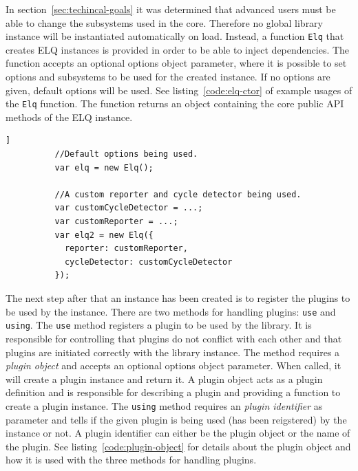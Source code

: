 \documentclass[a4paper,11pt]{kth-mag}
\newcommand{\code}[1]{\texttt{#1}}
\newcommand\abbr[2][]{\uppercase{#2}\ifthenelse{\equal{#1}{}}%
                     {}{#1}}
\begin{document}
        In section~\ref{sec:techincal-goals} it was determined that advanced users must be able to change the subsystems used in the core.
        Therefore no global library instance will be instantiated automatically on load.
        Instead, a function \code{Elq} that creates \abbr{elq} instances is provided in order to be able to inject dependencies.
        The function accepts an optional options object parameter, where it is possible to set options and subsystems to be used for the created instance.
        If no options are given, default options will be used.
        See listing~\ref{code:elq-ctor} of example usages of the \code{Elq} function.
        The function returns an object containing the core public \gls{API} methods of the \abbr{elq} instance.
        \begin{lstlisting}[gobble=10,caption={Example usages of the \code{Elq} function that creates \abbr{elq} instances.},captionpos=b,label={code:elq-ctor}]]
          //Default options being used.
          var elq = new Elq();

          //A custom reporter and cycle detector being used.
          var customCycleDetector = ...;
          var customReporter = ...;
          var elq2 = new Elq({
            reporter: customReporter,
            cycleDetector: customCycleDetector
          });
        \end{lstlisting}

        The next step after that an instance has been created is to register the plugins to be used by the instance.
        There are two methods for handling plugins: \code{use} and \code{using}.
        The \code{use} method registers a plugin to be used by the library.
        It is responsible for controlling that plugins do not conflict with each other and that plugins are initiated correctly with the library instance.
        The method requires a \emph{plugin object} and accepts an optional options object parameter.
        When called, it will create a plugin instance and return it.
        A plugin object acts as a plugin definition and is responsible for describing a plugin and providing a function to create a plugin instance.
        The \code{using} method requires an \emph{plugin identifier} as parameter and tells if the given plugin is being used (has been reigstered) by the instance or not.
        A plugin identifier can either be the plugin object or the name of the plugin.
        See listing~\ref{code:plugin-object} for details about the plugin object and how it is used with the three methods for handling plugins.
\end{document}
